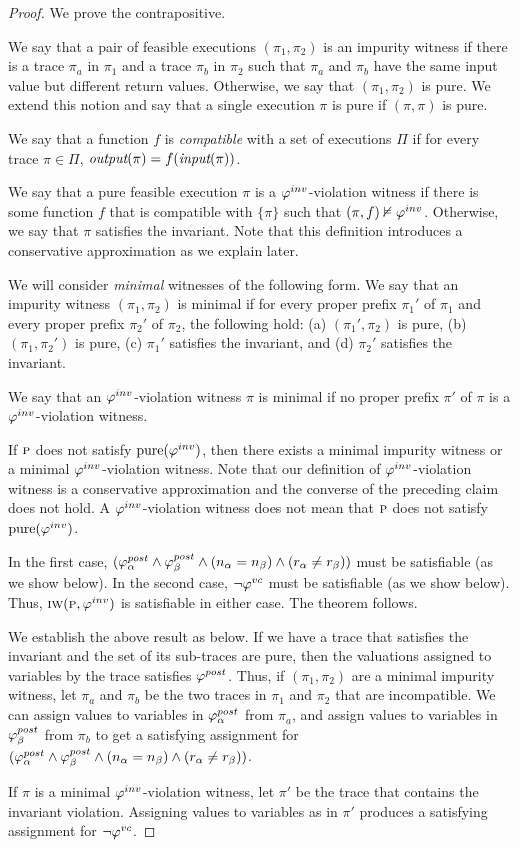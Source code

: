 \begin{proof}
We prove the contrapositive.

We say that a pair of feasible executions $(\pi_1, \pi_2)$ is an impurity witness if there is a trace
$\pi_a$ in $\pi_1$ and a trace $\pi_b$ in $\pi_2$ such that $\pi_a$ and $\pi_b$ have the same input
value but different return values. Otherwise, we say that $(\pi_1, \pi_2)$ is pure. We extend
this notion and say that a single execution $\pi$ is pure if $(\pi,\pi)$ is pure.

We say that a function $f$ is \emph{compatible} with a set of executions $\Pi$ if for every trace
$\pi \in \Pi$, $\textit{output}(\pi) = f(\textit{input}(\pi))$.

We say that a pure feasible execution $\pi$ is a $\varphi^{inv}$-violation witness if there is some function $f$
that is compatible with $\{\pi\}$ such that $(\pi,f) \nvDash \varphi^{inv}$. Otherwise, we say that $\pi$ satisfies
the invariant. Note that this definition introduces a conservative approximation as we explain later.

We will consider \emph{minimal} witnesses of the following form.
We say that an impurity witness $(\pi_1, \pi_2)$ is minimal if for every proper prefix $\pi_1'$ of
$\pi_1$ and every proper prefix $\pi_2'$ of $\pi_2$, the following hold:
(a) $(\pi_1',\pi_2)$ is pure,
(b) $(\pi_1,\pi_2')$ is pure,
(c) $\pi_1'$ satisfies the invariant, and
(d) $\pi_2'$ satisfies the invariant.

We say that an $\varphi^{inv}$-violation witness $\pi$ is minimal if no proper prefix $\pi'$ of
$\pi$ is a $\varphi^{inv}$-violation witness.

If $\textsc{p}$ does not satisfy $\mathrm{pure}(\varphi^{inv})$, then there exists a minimal impurity witness
or a minimal $\varphi^{inv}$-violation witness. Note that our definition of $\varphi^{inv}$-violation witness is
a conservative approximation and the converse of the preceding claim does not hold.
A  $\varphi^{inv}$-violation witness does not mean that $\textsc{p}$ does not satisfy $\mathrm{pure}(\varphi^{inv})$.

In the first case, $(\varphi^{post}_\alpha \wedge \varphi^{post}_\beta \wedge (n_\alpha = n_\beta) \wedge (r_\alpha \neq r_\beta))$
must be satisfiable (as we show below). In the second case, $\neg \varphi^{vc}$ must be satisfiable (as we show below).
Thus,  $\textsc{iw}(\textsc{p}, \varphi^{inv})$  is satisfiable in either case. The theorem follows.

We establish the above result as below.
If we have a trace that satisfies the invariant and the set of its sub-traces are pure,
then the valuations assigned to variables by the trace satisfies $\varphi^{post}$.
Thus, if $(\pi_1,\pi_2)$ are a minimal impurity witness, let $\pi_a$ and $\pi_b$
be the two traces in $\pi_1$ and $\pi_2$ that are incompatible.
We can assign values to variables in $\varphi^{post}_\alpha$ from $\pi_a$, and
assign values to variables in $\varphi^{post}_\beta$ from $\pi_b$ to get a satisfying
assignment for $(\varphi^{post}_\alpha \wedge \varphi^{post}_\beta \wedge (n_\alpha = n_\beta) \wedge (r_\alpha \neq r_\beta))$.

If $\pi$ is a minimal $\varphi^{inv}$-violation witness, let $\pi'$ be the trace that contains the invariant violation.
Assigning values to variables as in $\pi'$ produces a satisfying assignment for
$\neg \varphi^{vc}$.
\end{proof}